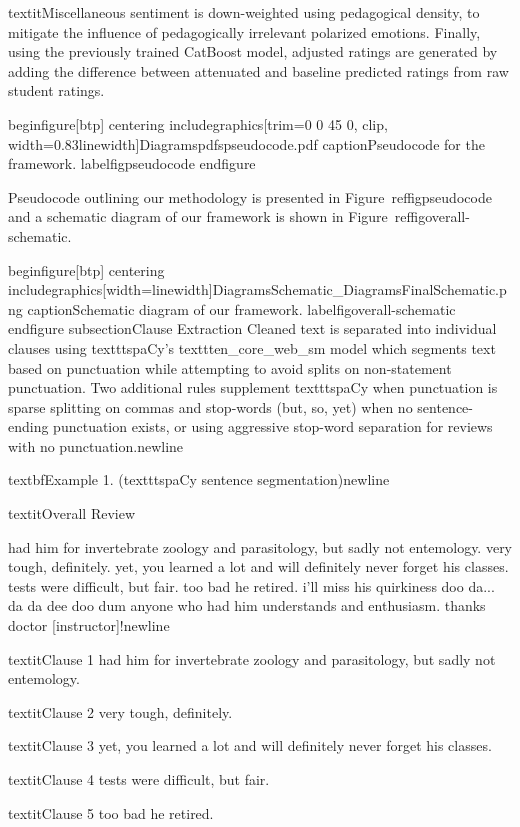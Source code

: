 textit{Miscellaneous} sentiment is down-weighted using pedagogical density, to mitigate the influence of pedagogically irrelevant polarized emotions. Finally, using the previously trained CatBoost model, adjusted ratings are generated by adding the difference between attenuated and baseline predicted ratings from raw student ratings.

begin{figure}[btp]  
    centering
    includegraphics[trim=0 0 45 0, clip, width=0.83linewidth]{Diagramspdfspseudocode.pdf}
    caption{Pseudocode for the framework.}
    label{figpseudocode}
end{figure}

Pseudocode outlining our methodology is presented in Figure~ref{figpseudocode} and a schematic diagram of our framework is shown in Figure~ref{figoverall-schematic}.  

begin{figure}[btp]  
    centering
    includegraphics[width=linewidth]{DiagramsSchematic_DiagramsFinalSchematic.png}
    caption{Schematic diagram of our framework.}
    label{figoverall-schematic}
end{figure}
subsection{Clause Extraction}
Cleaned text is separated into individual clauses using texttt{spaCy}'s texttt{en_core_web_sm} model which segments text based on punctuation while attempting to avoid splits on non-statement punctuation.
Two additional rules supplement texttt{spaCy} when punctuation is sparse splitting on commas and stop-words (but, so, yet) when no sentence-ending punctuation exists, or using aggressive stop-word separation for reviews with no punctuation.newline

textbf{Example 1. (texttt{spaCy} sentence segmentation)}newline

textit{Overall Review}

had him for invertebrate zoology and parasitology, but sadly not entemology. very tough, definitely. yet, you learned a lot and will definitely never forget his classes. tests were difficult, but fair. too bad he retired. i'll miss his quirkiness doo da... da da dee doo dum anyone who had him understands and enthusiasm. thanks doctor [instructor]!newline

textit{Clause 1}
had him for invertebrate zoology and parasitology, but sadly not entemology.

textit{Clause 2}
very tough, definitely.

textit{Clause 3}
yet, you learned a lot and will definitely never forget his classes.

textit{Clause 4}
tests were difficult, but fair.

textit{Clause 5}
too bad he retired.

